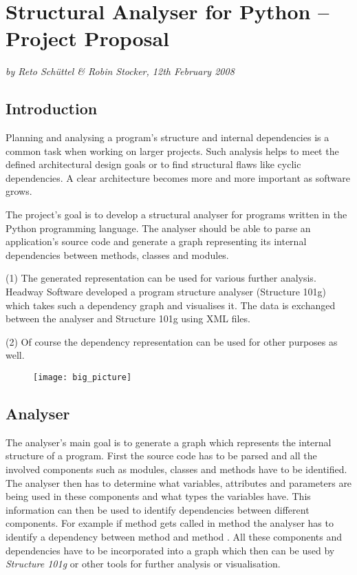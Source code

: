 \documentclass[12pt,halfparskip]{scrartcl}
\begin{document}
\pagestyle{plain}

\section*{Structural Analyser for Python – Project Proposal}
\vspace{-0.5cm}

\emph{by Reto Schüttel \& Robin Stocker, 12th February 2008}

\vspace{-0.3cm}

\subsection*{Introduction}

Planning and analysing a program's structure and internal dependencies is a common task when working on larger projects. Such analysis helps to meet the defined architectural design goals or to find structural flaws like cyclic dependencies. A clear architecture becomes more and more important as software grows.

The project's goal is to develop a structural analyser for programs written in the Python programming language. The analyser should be able to parse an application's source code and generate a graph representing its internal dependencies between methods, classes and modules. 

(1) The generated representation can be used for various further analysis. Headway Software developed a program structure analyser (Structure 101g) which takes such a dependency graph and visualises it. The data is exchanged between the analyser and Structure 101g using XML files.

(2) Of course the dependency representation can be used for other purposes as well.

\begin{figure}[h] \centering
\texttt{[image: big\_picture]}
\end{figure}


\subsection*{Analyser}

The analyser's main goal is to generate a graph which represents the internal structure of a program. First the source code has to be parsed and all the involved components such as modules, classes and methods have to be identified. The analyser then has to determine what variables, attributes and parameters are being used in these components and what types the variables have. This information can then be used to identify dependencies between different components. For example if method  gets called in method  the analyser has to identify a dependency between method  and method . All these components and dependencies have to be incorporated into a graph which then can be used by \emph{Structure 101g} or other tools for further analysis or visualisation. 
\end{document}
